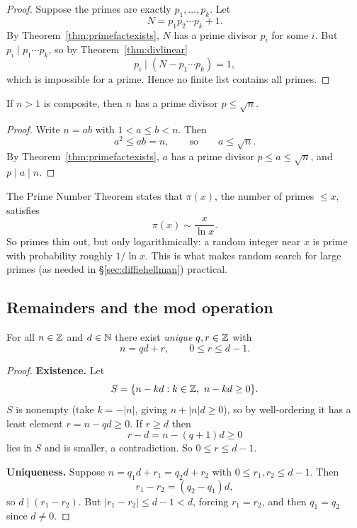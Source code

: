 \documentclass[11pt]{article}
\begin{document}
\begin{proof}
Suppose the primes are exactly $p_1,\dots,p_k$. Let
\[
N=p_1p_2\cdots p_k+1.
\]
By Theorem~\ref{thm:primefactexists}, $N$ has a prime divisor $p_i$ for some $i$. But $p_i\mid p_1\cdots p_k$, so by Theorem~\ref{thm:divlinear}
\[
p_i\mid (N-p_1\cdots p_k) = 1,
\]
which is impossible for a prime. Hence no finite list contains all primes.
\end{proof}

\begin{theorem}
\label{thm:sqrtbound}
If $n>1$ is composite, then $n$ has a prime divisor $p\le\sqrt n$.
\end{theorem}

\begin{proof}
Write $n=ab$ with $1<a\le b<n$. Then
\[
a^2\le ab=n, \qquad\text{so}\qquad a\le\sqrt n.
\]
By Theorem~\ref{thm:primefactexists}, $a$ has a prime divisor $p\le a\le\sqrt n$, and $p\mid a\mid n$.
\end{proof}

\begin{note}
The Prime Number Theorem states that $\pi(x)$, the number of primes $\le x$, satisfies
\[
\pi(x)\sim\frac{x}{\ln x}.
\]
So primes thin out, but only logarithmically: a random integer near $x$ is prime with probability roughly $1/\ln x$. This is what makes random search for large primes (as needed in \S\ref{sec:diffiehellman}) practical.
\end{note}

\subsection{Remainders and the mod operation}
\label{sec:mod}

\begin{theorem}
\label{thm:division}
For all $n\in\mathbb{Z}$ and $d\in\mathbb{N}$ there exist \emph{unique} $q,r\in\mathbb{Z}$ with
\[
n=qd+r, \qquad 0\le r\le d-1.
\]
\end{theorem}

\begin{proof}
\textbf{Existence.} Let
\[
S=\{n-kd : k\in\mathbb{Z},\ n-kd\ge0\}.
\]
$S$ is nonempty (take $k=-|n|$, giving $n+|n|d\ge0$), so by well-ordering it has a least element $r=n-qd\ge0$. If $r\ge d$ then
\[
r-d=n-(q+1)d\ge0
\]
lies in $S$ and is smaller, a contradiction. So $0\le r\le d-1$.

\medskip
\noindent\textbf{Uniqueness.} Suppose $n=q_1d+r_1=q_2d+r_2$ with $0\le r_1,r_2\le d-1$. Then
\[
r_1-r_2=(q_2-q_1)d,
\]
so $d\mid(r_1-r_2)$. But $|r_1-r_2|\le d-1<d$, forcing $r_1=r_2$, and then $q_1=q_2$ since $d\ne0$.
\end{proof}
\end{document}
